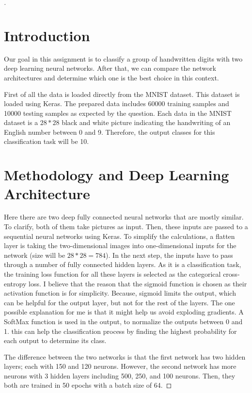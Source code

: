 \documentclass[12pt,oneside,geqno]{article}
\begin{document}
	\begin{proof}[\color{red}{Solution}]
		
		\section{Introduction}
		Our goal in this assignment is to classify a group of handwritten digits with two deep learning neural networks. After that, we can compare the network architectures and determine which one is the best choice in this context. 
		
		First of all the data is loaded directly from the MNIST dataset. This dataset is loaded using Keras. The prepared data includes 60000 training samples and 10000 testing samples as expected by the question. Each data in the MNIST dataset is a \(28*28\) black and white picture indicating the handwriting of an English number between 0 and 9. Therefore, the output classes for this classification task will be 10.
		
		\section{Methodology and Deep Learning Architecture}
		
		Here there are two deep fully connected neural networks that are mostly similar. To clarify, both of them take pictures as input. Then, these inputs are passed to a sequential neural networks using Keras. To simplify the calculations, a flatten layer is taking the two-dimensional images into one-dimensional inputs for the network (size will be \(28*28=784\)). In the next step, the inputs have to pass through a number of fully connected hidden layers. As it is a classification task, the training loss function for all these layers is selected as the categorical cross-entropy loss. I believe that the reason that the sigmoid function is chosen as their activation function is for simplicity. Because, sigmoid limits the output, which can be helpful for the output layer, but not for the rest of the layers. The one possible explanation for me is that it might help us avoid exploding gradients. A SoftMax function is used in the output, to normalize the outputs between 0 and 1. this can help the classification process by finding the highest probability for each output to determine its class.
		
		The difference between the two networks is that the first network has two hidden layers; each with 150 and 120 neurons. However, the second network has more neurons with 3 hidden layers including 500, 250, and 100 neurons. Then, they both are trained in 50 epochs with a batch size of 64. 
		

\end{proof}
\end{document}
